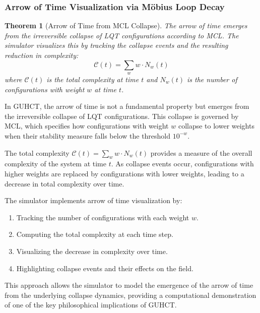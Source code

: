 \documentclass[11pt,a4paper]{article}
\makeatletter
\newtheorem{theorem}{Theorem}[section]
\renewenvironment{proof}[1][\proofname]{\par
  \pushQED{\qed}%
  \normalfont \topsep6\p@\@plus6\p@\relax
  \trivlist
  \item[\hskip\labelsep
        \itshape
    #1\@addpunct{.}]\ignorespaces
}{%
  \popQED\endtrivlist\@endpefalse
}
\makeatother
\begin{document}
\subsubsection{Arrow of Time Visualization via Möbius Loop Decay}
\label{ssubsec:arrow_of_time}

\begin{theorem}[Arrow of Time from MCL Collapse]
\label{thm:arrow_of_time}
The arrow of time emerges from the irreversible collapse of LQT configurations according to MCL. The simulator visualizes this by tracking the collapse events and the resulting reduction in complexity:
\begin{equation}
\mathcal{C}(t) = \sum_w w \cdot N_w(t)
\end{equation}
where $\mathcal{C}(t)$ is the total complexity at time $t$ and $N_w(t)$ is the number of configurations with weight $w$ at time $t$.
\end{theorem}

\begin{proof}
In GUHCT, the arrow of time is not a fundamental property but emerges from the irreversible collapse of LQT configurations. This collapse is governed by MCL, which specifies how configurations with weight $w$ collapse to lower weights when their stability measure falls below the threshold $10^{-w}$.

The total complexity $\mathcal{C}(t) = \sum_w w \cdot N_w(t)$ provides a measure of the overall complexity of the system at time $t$. As collapse events occur, configurations with higher weights are replaced by configurations with lower weights, leading to a decrease in total complexity over time.

The simulator implements arrow of time visualization by:
\begin{enumerate}
    \item Tracking the number of configurations with each weight $w$.
    \item Computing the total complexity at each time step.
    \item Visualizing the decrease in complexity over time.
    \item Highlighting collapse events and their effects on the field.
\end{enumerate}

This approach allows the simulator to model the emergence of the arrow of time from the underlying collapse dynamics, providing a computational demonstration of one of the key philosophical implications of GUHCT.
\end{proof}
\end{document}

